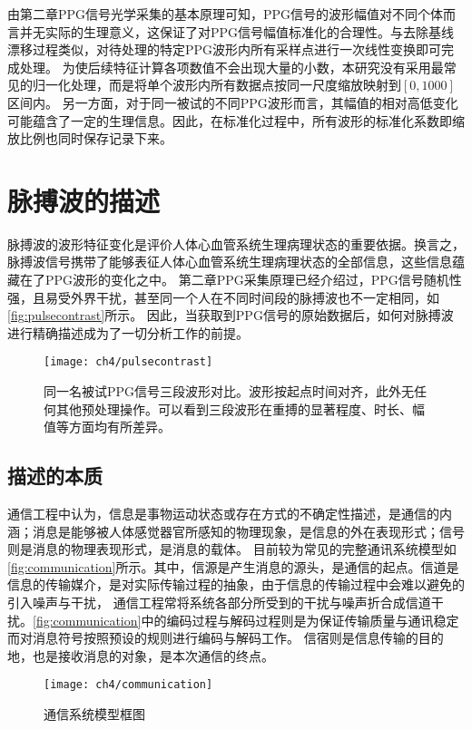 由第二章PPG信号光学采集的基本原理可知，PPG信号的波形幅值对不同个体而言并无实际的生理意义，这保证了对PPG信号幅值标准化的合理性。与去除基线漂移过程类似，对待处理的特定PPG波形内所有采样点进行一次线性变换即可完成处理。
为使后续特征计算各项数值不会出现大量的小数，本研究没有采用最常见的归一化处理，而是将单个波形内所有数据点按同一尺度缩放映射到$[0,1000]$区间内。
另一方面，对于同一被试的不同PPG波形而言，其幅值的相对高低变化可能蕴含了一定的生理信息。因此，在标准化过程中，所有波形的标准化系数即缩放比例也同时保存记录下来。

\section{脉搏波的描述}
脉搏波的波形特征变化是评价人体心血管系统生理病理状态的重要依据\cite{PPGYY}。换言之，脉搏波信号携带了能够表征人体心血管系统生理病理状态的全部信息，这些信息蕴藏在了PPG波形的变化之中。
第二章PPG采集原理已经介绍过，PPG信号随机性强，且易受外界干扰，甚至同一个人在不同时间段的脉搏波也不一定相同，如\autoref{fig:pulsecontrast}所示。
因此，当获取到PPG信号的原始数据后，如何对脉搏波进行精确描述成为了一切分析工作的前提。
\begin{figure}[htbp]
    \centering
    \texttt{[image: ch4/pulsecontrast]}
    \caption[同一名被试PPG信号三段波形对比]{\label{fig:pulsecontrast}同一名被试PPG信号三段波形对比。波形按起点时间对齐，此外无任何其他预处理操作。可以看到三段波形在重搏的显著程度、时长、幅值等方面均有所差异。}
\end{figure}
\subsection{描述的本质}
通信工程中认为，信息是事物运动状态或存在方式的不确定性描述，是通信的内涵；消息是能够被人体感觉器官所感知的物理现象，是信息的外在表现形式；信号则是消息的物理表现形式，是消息的载体\cite{Shannon1948,Liu2019,Zhao2017}。
目前较为常见的完整通讯系统模型如\autoref{fig:communication}所示。其中，信源是产生消息的源头，是通信的起点。信道是信息的传输媒介，是对实际传输过程的抽象，由于信息的传输过程中会难以避免的引入噪声与干扰，
通信工程常将系统各部分所受到的干扰与噪声折合成信道干扰。\autoref{fig:communication}中的编码过程与解码过程则是为保证传输质量与通讯稳定而对消息符号按照预设的规则进行编码与解码工作。
信宿则是信息传输的目的地，也是接收消息的对象，是本次通信的终点\cite{Zhao2017}。
\begin{figure}[htbp]
    \centering
    \texttt{[image: ch4/communication]}
    \caption[通信系统模型框图]{\label{fig:communication}通信系统模型框图\cite{Zhao2017,Liu2019}}
\end{figure}

